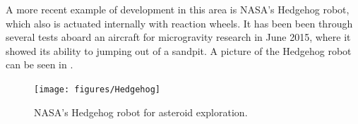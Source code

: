 %
A more recent example of development in this area is NASA's Hedgehog robot, which also is actuated internally with reaction wheels. It has been been through several tests aboard an aircraft for microgravity research in June 2015, where it showed its ability to jumping out of a sandpit. A picture of the Hedgehog robot can be seen in .\cite{ELandau}
%
\begin{figure}[H] 
	\centering
	\texttt{[image: figures/Hedgehog]}
	\caption{NASA's Hedgehog robot for asteroid exploration\cite{ELandau}.}
	\label{Hedgehog}
\end{figure}